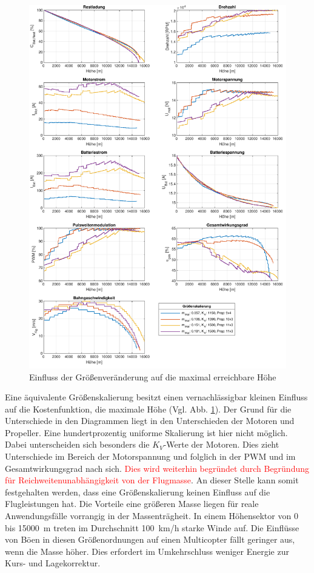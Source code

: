 \begin{figure}[H]
	\includegraphics[scale=0.7]{Diagramme/Groessenskalierung.pdf}
	\caption{Einfluss der Größenveränderung auf die maximal erreichbare Höhe}
	\label{abb:groessenskalierung}
\end{figure}
Eine äquivalente Größenskalierung besitzt einen vernachlässigbar kleinen Einfluss auf die Kostenfunktion, die maximale Höhe (Vgl. Abb. \ref{abb:groessenskalierung}). Der Grund für die Unterschiede in den Diagrammen liegt in den Unterschieden der Motoren und Propeller. Eine hundertprozentig uniforme Skalierung ist hier nicht möglich. Dabei unterscheiden sich besonders die \ensuremath{K_V}-Werte der Motoren. Dies zieht Unterschiede im Bereich der Motorspannung und folglich in der PWM und im Gesamtwirkungsgrad nach sich.
\textcolor{red}{Dies wird weiterhin begründet durch Begründung für Reichweitenunabhängigkeit von der Flugmasse}. An dieser Stelle kann somit festgehalten werden, dass eine Größenskalierung keinen Einfluss auf die Flugleistungen hat. Die Vorteile eine größeren Masse liegen für reale Anwendungsfälle vorrangig in der Massenträgheit. In einem Höhensektor von \SI{0}{} bis \SI{15000}{m} treten im Durchschnitt \SI{100}{km/h} starke Winde auf. 
Die Einflüsse von Böen in diesen Größenordnungen auf einen Multicopter fällt geringer aus, wenn die Masse höher. Dies erfordert im Umkehrschluss weniger Energie zur Kurs- und Lagekorrektur.


